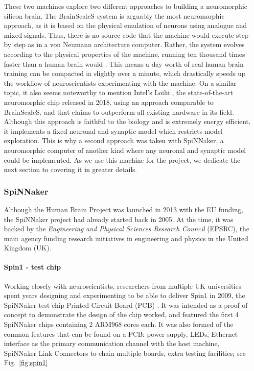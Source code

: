 These two machines explore two different approaches to building a neuromorphic silicon brain. The BrainScaleS system is arguably the most neuromorphic approach, as it is based on the physical emulation of neurons using analogue and mixed-signals. Thus, there is no source code that the machine would execute step by step as in a von Neumann architecture computer. Rather, the system evolves according to the physical properties of the machine, running ten thousand times faster than a human brain would \cite{hw}. This means a day worth of real human brain training can be compacted in slightly over a minute, which drastically speeds up the workflow of neuroscientists experimenting with the machine. On a similar topic, it also seems noteworthy to mention Intel's Loihi \cite{loihi}, the state-of-the-art neuromorphic chip released in 2018, using an approach comparable to BrainScaleS, and that claims to outperform all existing hardware in its field. \\

Although this approach is faithful to the biology and is extremely energy efficient, it implements a fixed neuronal and synaptic model which restricts model exploration. This is why a second approach was taken with SpiNNaker, a neuromorphic computer of another kind where any neuronal and synaptic model could be implemented. As we use this machine for the project, we dedicate the next section to covering it in greater details. \\

\subsubsection{SpiNNaker}

Although the Human Brain Project \cite{hbp} was launched in 2013 with the EU funding, the SpiNNaker project had already started back in 2005. At the time, it was backed by the \textit{Engineering and Physical Sciences Research Council} (EPSRC), the main agency funding research initiatives in engineering and physics in the United Kingdom (UK). \\

\paragraph{Spin1 - test chip}

Working closely with neuroscientists, researchers from multiple UK universities spent years designing and experimenting to be able to deliver Spin1 in 2009, the SpiNNaker test chip Printed Circuit Board (PCB) \cite{dev-process}. It was intended as a proof of concept to demonstrate the design of the chip worked, and featured the first 4 SpiNNaker chips containing 2 ARM968 cores each. It was also formed of the common features that can be found on a PCB: power supply, LEDs, Ethernet interface as the primary communication channel with the host machine, SpiNNaker Link Connectors to chain multiple boards, extra testing facilities; see Fig.~\ref{fig:spin1} \\

